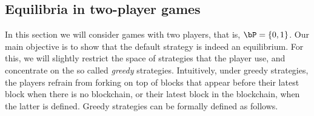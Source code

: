 \subsection{Equilibria in two-player games} 

In this section we will consider games with two players, that is, $\bP = \{0,1\}$. Our main objective is to show that the default strategy is indeed an equilibrium. For this, we will slightly restrict the space of strategies that the player use, and concentrate on the so called {\em greedy} strategies. Intuitively, under greedy strategies, the players refrain from forking on top of blocks that appear before their latest block when there is no blockchain, or their latest block in the blockchain, when the latter is defined. Greedy strategies can be formally defined as follows.



